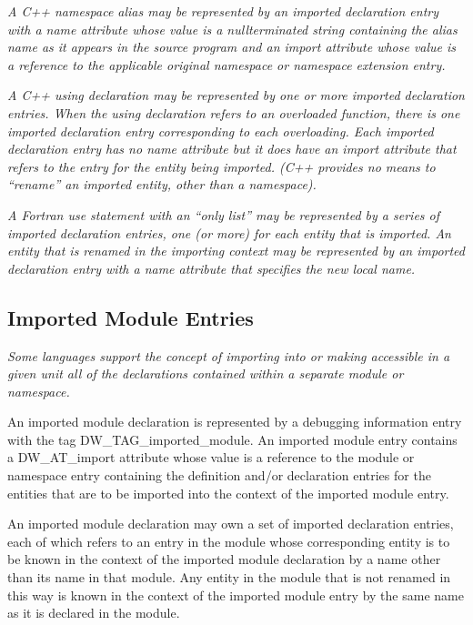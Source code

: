 \textit{A C++ namespace alias may be represented by an imported
declaration entry with a name attribute whose value is
a null\dash terminated string containing the alias name as it
appears in the source program and an import attribute whose
value is a reference to the applicable original namespace or
namespace extension entry.
}

\textit{A C++ using declaration may be represented by one or more
imported declaration entries.  When the using declaration
refers to an overloaded function, there is one imported
declaration entry corresponding to each overloading. Each
imported declaration entry has no name attribute but it does
have an import attribute that refers to the entry for the
entity being imported. (C++ provides no means to ``rename''
an imported entity, other than a namespace).
}

\textit{A Fortran use statement with an ``only list'' may be
represented by a series of imported declaration entries,
one (or more) for each entity that is imported. An entity
that is renamed in the importing context may be represented
by an imported declaration entry with a name attribute that
specifies the new local name.
}

\subsection{Imported Module Entries}
\label{chap:importedmoduleentries}

\textit{Some languages support the concept of importing into or making
accessible in a given unit all of the declarations contained
within a separate module or namespace.
}

An imported module declaration is represented by a debugging
information entry with the tag DW\-\_TAG\-\_imported\-\_module. An
imported module entry contains a DW\-\_AT\-\_import attribute
whose value is a reference to the module or namespace entry
containing the definition and/or declaration entries for
the entities that are to be imported into the context of the
imported module entry.

An imported module declaration may own a set of imported
declaration entries, each of which refers to an entry in the
module whose corresponding entity is to be known in the context
of the imported module declaration by a name other than its
name in that module. Any entity in the module that is not
renamed in this way is known in the context of the imported
module entry by the same name as it is declared in the module.

